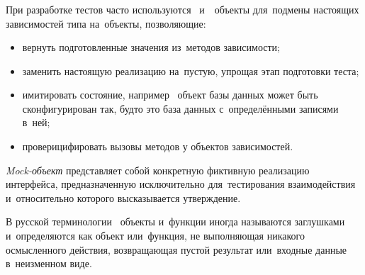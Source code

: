 \subsubsection{}
\label{sec:testing:unit:mock}

При разработке тестов часто используются \mock \, и~\stub \, объекты для~подмены настоящих зависимостей типа на~объекты, позволяющие:

\begin{itemize}
	\item вернуть подготовленные значения из~методов зависимости;
	\item заменить настоящую реализацию на~пустую, упрощая этап подготовки теста;
	\item имитировать состояние, например \stub \, объект базы данных может быть сконфигурирован так, будто это база данных с~определёнными записями в~ней;
	\item проверицифировать вызовы методов у объектов зависимостей.
\end{itemize}

\textit{Mock-объект} представляет собой конкретную фиктивную реализацию интерфейса, предназначенную исключительно для~тестирования взаимодействия и~относительно которого высказывается утверждение\cite{wiki:mock}.

В русской терминологии \stub \, объекты и~функции иногда называются заглушками и~определяются как объект или~функция, не выполняющая никакого осмысленного действия, возвращающая пустой результат или~входные данные в~неизменном виде\cite{wiki:stub}.